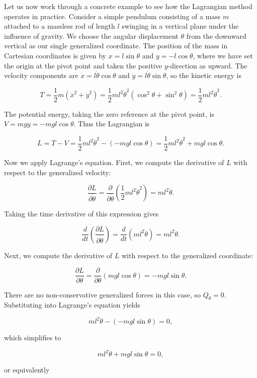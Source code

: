 Let us now work through a concrete example to see how the Lagrangian method operates in practice. Consider a simple pendulum consisting of a mass $m$ attached to a massless rod of length $l$ swinging in a vertical plane under the influence of gravity. We choose the angular displacement $\theta$ from the downward vertical as our single generalized coordinate. The position of the mass in Cartesian coordinates is given by $x = l \sin \theta$ and $y = -l \cos \theta$, where we have set the origin at the pivot point and taken the positive $y$-direction as upward. The velocity components are $\dot{x} = l \dot{\theta} \cos \theta$ and $\dot{y} = l \dot{\theta} \sin \theta$, so the kinetic energy is

$$T = \frac{1}{2} m (\dot{x}^2 + \dot{y}^2) = \frac{1}{2} m l^2 \dot{\theta}^2 (\cos^2 \theta + \sin^2 \theta) = \frac{1}{2} m l^2 \dot{\theta}^2.$$

The potential energy, taking the zero reference at the pivot point, is $V = mgy = -mgl \cos \theta$. Thus the Lagrangian is

$$L = T - V = \frac{1}{2} m l^2 \dot{\theta}^2 - (-mgl \cos \theta) = \frac{1}{2} m l^2 \dot{\theta}^2 + mgl \cos \theta.$$

Now we apply Lagrange's equation. First, we compute the derivative of $L$ with respect to the generalized velocity:

$$\frac{\partial L}{\partial \dot{\theta}} = \frac{\partial}{\partial \dot{\theta}} \left( \frac{1}{2} m l^2 \dot{\theta}^2 \right) = m l^2 \dot{\theta}.$$

Taking the time derivative of this expression gives

$$\frac{d}{dt}\left(\frac{\partial L}{\partial \dot{\theta}}\right) = \frac{d}{dt} \left( m l^2 \dot{\theta} \right) = m l^2 \ddot{\theta}.$$

Next, we compute the derivative of $L$ with respect to the generalized coordinate:

$$\frac{\partial L}{\partial \theta} = \frac{\partial}{\partial \theta} \left( mgl \cos \theta \right) = -mgl \sin \theta.$$

There are no non-conservative generalized forces in this case, so $Q_\theta = 0$. Substituting into Lagrange's equation yields

$$m l^2 \ddot{\theta} - (-mgl \sin \theta) = 0,$$

which simplifies to

$$m l^2 \ddot{\theta} + mgl \sin \theta = 0,$$

or equivalently

